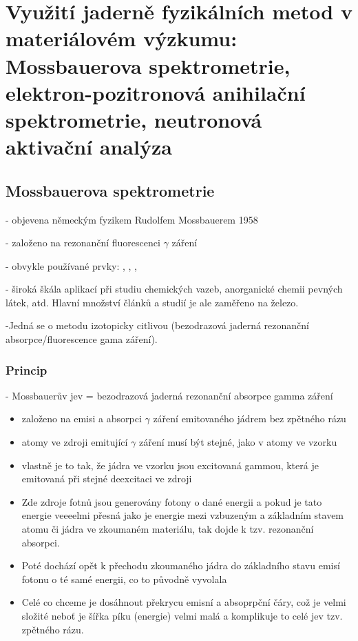 \newpage
\section{Využití jaderně fyzikálních metod v materiálovém výzkumu: Mossbauerova spektrometrie, elektron-pozitronová anihilační spektrometrie, neutronová aktivační analýza}


\subsection{Mossbauerova spektrometrie}
- objevena německým fyzikem Rudolfem Mossbauerem 1958

- založeno na rezonanční fluorescenci $\gamma$ záření

- obvykle používané prvky: , , , 

- široká škála aplikací při studiu chemických vazeb, anorganické chemii pevných látek, atd. Hlavní množství článků a studií je ale zaměřeno na železo.

-Jedná se o metodu izotopicky citlivou (bezodrazová jaderná rezonanční absorpce/fluorescence gama záření).

\subsubsection{Princip}

- Mossbauerův jev = bezodrazová jaderná rezonanční absorpce gamma záření

\begin{itemize}
    \item založeno na emisi a absorpci $\gamma$ záření emitovaného jádrem bez zpětného rázu

    \item atomy ve zdroji emitující $\gamma$ záření musí být stejné, jako v atomy ve vzorku

    \item vlastně je to tak, že jádra ve vzorku jsou excitovaná gammou, která je emitovaná při stejné deexcitaci ve zdroji


    \item Zde zdroje fotnů jsou generovány fotony o dané energii a pokud je tato energie veeeelmi přesná jako je energie mezi vzbuzeným a základním stavem atomu či jádra ve zkoumaném materiálu, tak dojde k tzv. rezonanční absorpci.

    \item Poté dochází opět k přechodu zkoumaného jádra do základního stavu emisí fotonu o té samé energii, co to původně vyvolala

    \item Celé co chceme je dosáhnout překrycu emisní a absoprpční čáry, což je velmi složité neboť je šířka píku (energie) velmi malá a komplikuje to celé jev tzv. zpětného rázu.
\end{itemize}

